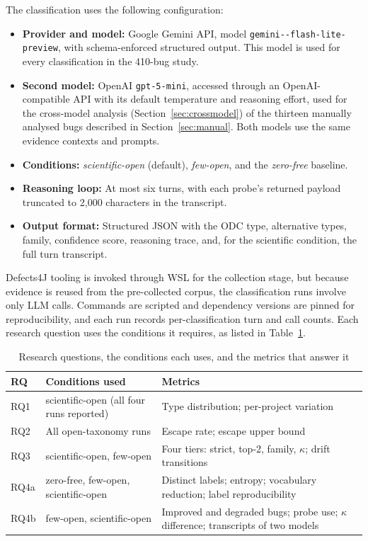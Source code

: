 \documentclass{iutbscthesis}
\newcommand{\modelname}{\texttt{gemini-\allowbreak 3.1-\allowbreak flash-\allowbreak lite-\allowbreak preview}}
\begin{document}
The classification uses the following configuration:
\begin{itemize}
    \item \textbf{Provider and model:} Google Gemini API, model \modelname, with schema-enforced structured output. This model is used for every classification in the 410-bug study.
    \item \textbf{Second model:} OpenAI \texttt{gpt-5-mini}, accessed through an OpenAI-compatible API with its default temperature and reasoning effort, used for the cross-model analysis (Section~\ref{sec:crossmodel}) of the thirteen manually analysed bugs described in Section~\ref{sec:manual}. Both models use the same evidence contexts and prompts.
    \item \textbf{Conditions:} \textit{scientific-open} (default), \textit{few-open}, and the \textit{zero-free} baseline.
    \item \textbf{Reasoning loop:} At most six turns, with each probe's returned payload truncated to 2{,}000 characters in the transcript.
    \item \textbf{Output format:} Structured JSON with the ODC type, alternative types, family, confidence score, reasoning trace, and, for the scientific condition, the full turn transcript.
\end{itemize}

Defects4J tooling is invoked through WSL for the collection stage, but because evidence is reused from the pre-collected corpus, the classification runs involve only LLM calls. Commands are scripted and dependency versions are pinned for reproducibility, and each run records per-classification turn and call counts. Each research question uses the conditions it requires, as listed in Table~\ref{tab:rqmap}.

\begin{table}[!htbp]
    \centering
    \begin{tabular}{l p{4.4cm} p{6.4cm}}
        \toprule
        \textbf{RQ} & \textbf{Conditions used} & \textbf{Metrics} \\
        \midrule
        RQ1 & scientific-open (all four runs reported) & Type distribution; per-project variation \\
        RQ2 & All open-taxonomy runs & Escape rate; escape upper bound \\
        RQ3 & scientific-open, few-open & Four tiers: strict, top-2, family, $\kappa$; drift transitions \\
        RQ4a & zero-free, few-open, scientific-open & Distinct labels; entropy; vocabulary reduction; label reproducibility \\
        RQ4b & few-open, scientific-open & Improved and degraded bugs; probe use; $\kappa$ difference; transcripts of two models \\
        \bottomrule
    \end{tabular}
    \caption{Research questions, the conditions each uses, and the metrics that answer it}
    \label{tab:rqmap}
\end{table}
\end{document}
